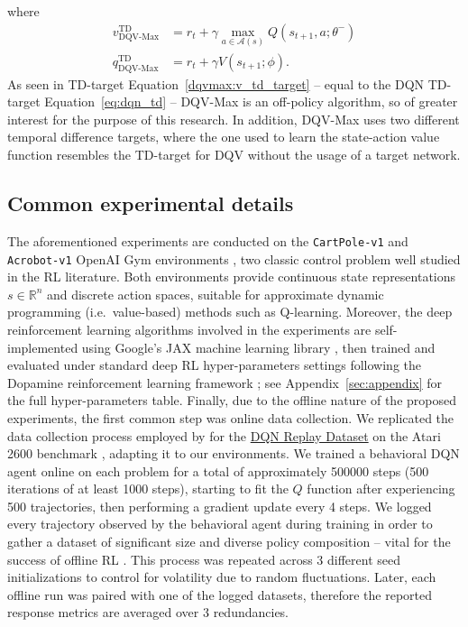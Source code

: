 where
\begin{align}
  v^{\scriptscriptstyle \textrm{TD}}_{\scriptscriptstyle
  \textrm{DQV-Max}}&=r_t+\gamma\max_{a\in\mathcal{A}\left(s\right)}Q\left(s_{t+1},a;\theta^{-}\right)
  \label{dqvmax:v_td_target}\\
  q^{\scriptscriptstyle \textrm{TD}}_{\scriptscriptstyle \textrm{DQV-Max}}&=r_t+\gamma
  V\left(s_{t+1};\phi\right).
\end{align} As seen in TD-target
Equation~\ref{dqvmax:v_td_target} -- equal to the DQN TD-target
Equation~\ref{eq:dqn_td} -- DQV-Max is an off-policy algorithm, so
of greater interest for the purpose of this research. In addition,
DQV-Max uses two different temporal difference targets, where the one
used to learn the state-action value function resembles the TD-target
for DQV without the usage of a target network.

\subsection{Common experimental details}
The aforementioned experiments are conducted on the
\texttt{CartPole-v1} and \texttt{Acrobot-v1} OpenAI Gym environments
\citep{https://doi.org/10.48550/arxiv.1606.01540}, two classic control
problem well studied in the RL literature. Both environments
provide continuous state representations $s\in \mathbb{R}^n$ and
discrete action spaces, suitable for approximate dynamic programming
(i.e.\ value-based) methods such as Q-learning. Moreover, the
deep reinforcement learning algorithms involved in the experiments are
self-implemented using Google's JAX machine learning library
\citep{jax2018github}, then trained and evaluated under standard deep
RL hyper-parameters settings following the Dopamine reinforcement
learning framework \citep{castro18dopamine}; see
Appendix~\ref{sec:appendix} for the full hyper-parameters
table. Finally, due to the offline nature of the proposed experiments,
the first common step was online data collection. We replicated the
data collection process employed by \citet{agarwal2020optimistic} for
the \href{https://research.google/tools/datasets/dqn-replay/}{DQN
  Replay Dataset} on the Atari 2600 benchmark
\citep{bellemare2013arcade}, adapting it to our environments. We
trained a behavioral DQN agent online on each problem for a total of
approximately 500000 steps (500 iterations of at least 1000 steps),
starting to fit the $Q$ function after experiencing 500
trajectories, then performing a gradient update every 4 steps. We
logged every trajectory observed by the behavioral agent during
training in order to gather a dataset of significant size and diverse
policy composition -- vital for the success of offline RL
\citep{agarwal2020optimistic}. This process was repeated across 3
different seed initializations to control for volatility due to random
fluctuations. Later, each offline run was paired with one of the
logged datasets, therefore the reported response metrics are averaged
over 3 redundancies.

